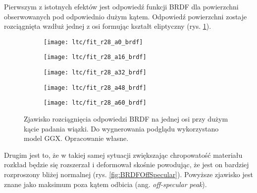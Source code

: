 \documentclass[../main.tex]{subfiles}
\begin{document}
Pierwszym z istotnych efektów jest odpowiedź funkcji BRDF dla powierzchni obserwowanych pod odpowiednio dużym kątem. Odpowiedź powierzchni zostaje rozciągnięta wzdłuż jednej z osi formując kształt eliptyczny (rys. \ref{fig:BRDFGrazingAnisotropy}).

\begin{figure}
    \centering
    
    \begin{subfigure}[t]{0.18\textwidth}
        \texttt{[image: ltc/fit\_r28\_a0\_brdf]}
    \end{subfigure}
    \begin{subfigure}[t]{0.18\textwidth}
        \texttt{[image: ltc/fit\_r28\_a16\_brdf]}
    \end{subfigure}
    \begin{subfigure}[t]{0.18\textwidth}
        \texttt{[image: ltc/fit\_r28\_a32\_brdf]}
    \end{subfigure}
    \begin{subfigure}[t]{0.18\textwidth}
        \texttt{[image: ltc/fit\_r28\_a48\_brdf]}
    \end{subfigure}
    \begin{subfigure}[t]{0.18\textwidth}
        \texttt{[image: ltc/fit\_r28\_a60\_brdf]}
    \end{subfigure}
    
    \caption{Zjawisko rozciągnięcia odpowiedzi BRDF na jednej osi przy dużym kącie padania wiązki. Do wygnerowania podglądu wykorzystano model GGX. Opracowanie własne.}
    \label{fig:BRDFGrazingAnisotropy}
\end{figure}

Drugim jest to, że w takiej samej sytuacji zwiększając chropowatość materiału rozkład będzie się rozszerzał i deformował skośnie powodując, że jest on bardziej rozproszony bliżej normalnej (rys. \ref{fig:BRDFOffSpecular}). Powyższe zjawisko jest znane jako maksimum poza kątem odbicia (ang. \textit{off-specular peak}).
\end{document}
